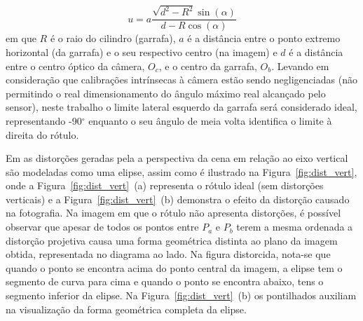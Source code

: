 \begin{equation}
    u = a \frac{\sqrt{d^2 - R^2} \sin{(\alpha)}}{d - R\cos{ \left (\alpha \right)}}
    \label{equacao:dist_horz} 
\end{equation}
em que $R$ é o raio do cilindro (garrafa), $a$ é a distância entre o ponto extremo horizontal (da garrafa) e o seu respectivo centro (na imagem) e $d$ é a distância entre o centro óptico da câmera, $O_{c}$, e o centro da garrafa, $O_{b}$. Levando em consideração que calibrações intrínsecas à câmera estão sendo negligenciadas (não permitindo o real dimensionamento do ângulo máximo real alcançado pelo sensor), neste trabalho o limite lateral esquerdo da garrafa será considerado ideal, representando -90$^\circ$ enquanto o seu ângulo de meia volta identifica o limite à direita do rótulo.

 
Em \cite{Lin:2013} as distorções geradas pela a perspectiva da cena em relação ao eixo vertical são modeladas como uma elipse, assim como é ilustrado na Figura~\ref{fig:dist_vert}, onde a Figura~\ref{fig:dist_vert}~(a) representa o rótulo ideal (sem distorções verticais) e a Figura~\ref{fig:dist_vert}~(b) demonstra o efeito da distorção causado na fotografia. Na imagem em que o rótulo não apresenta distorções, é possível observar que apesar de todos os pontos entre $P_{a}$ e $P_{b}$ terem a mesma ordenada a distorção projetiva causa uma forma geométrica distinta ao plano da imagem obtida, representada no diagrama ao lado. Na figura distorcida, nota-se que quando o ponto se encontra acima do ponto central da imagem, a elipse tem o segmento de curva para cima e quando o ponto se encontra abaixo, tens o segmento inferior da elipse. Na Figura~\ref{fig:dist_vert}~(b) os pontilhados auxiliam na visualização da forma geométrica completa da elipse.


